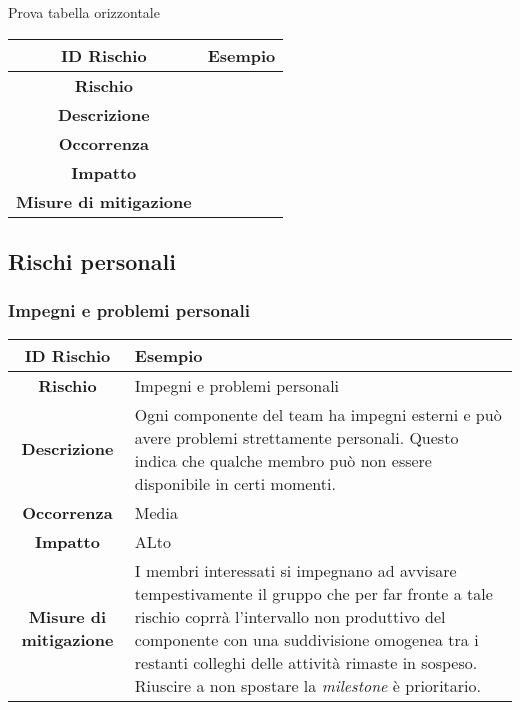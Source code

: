 \documentclass[10pt, a4paper]{article}
\begin{document}

Prova tabella orizzontale





{\renewcommand{\arraystretch}{1.5}
\begin{tabularx}{\textwidth}{>{\columncolor{primarycolor}}c|X}
\textbf{ID Rischio} & Esempio \\
\hline
\textbf{Rischio} &  \\
\hline
\textbf{Descrizione} & \\
\hline
\textbf{Occorrenza} & \\
\hline
\textbf{Impatto} & \\
\hline
\textbf{Misure di mitigazione} & \\
\end{tabularx}


\subsection{Rischi personali}


\subsubsection{Impegni e problemi personali}
{\renewcommand{\arraystretch}{1.5}
\begin{tabularx}{\textwidth}{c|X}
\textbf{ID Rischio} & Esempio \\
\hline
\textbf{Rischio} & Impegni e problemi personali\\
\hline
\textbf{Descrizione} & Ogni componente del team ha impegni esterni e può avere problemi strettamente personali. Questo indica che qualche membro può non essere disponibile in certi momenti.\\
\hline
\textbf{Occorrenza} & Media\\
\hline
\textbf{Impatto} & ALto\\
\hline
\textbf{Misure di mitigazione} & I membri interessati si impegnano ad avvisare tempestivamente il gruppo che per far fronte a tale rischio coprrà l’intervallo non produttivo del componente con una suddivisione omogenea tra i restanti colleghi delle attività rimaste in sospeso.
Riuscire a non spostare la \textit{milestone} è prioritario.\\
\end{tabularx}}




}
\end{document}

